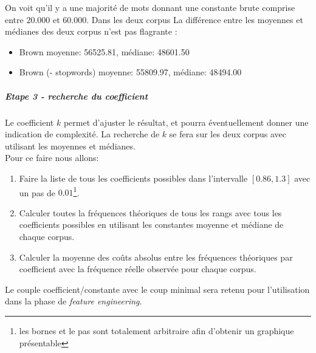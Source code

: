 \documentclass[a4paper,12pt]{article}
\begin{document}
			On voit qu'il y a une majorité de mots donnant une constante brute comprise entre $20.000$ et $60.000$. Dans les deux corpus
			La différence entre les moyennes et médianes des deux corpus n'est pas flagrante :
			\begin{itemize}
				\item Brown moyenne: 56525.81, médiane: 48601.50
				\item Brown (- stopwords) moyenne: 55809.97, médiane: 48494.00
			\end{itemize}


		\subparagraph{Etape 3 - recherche du coefficient}
			Le coefficient $k$ permet d'ajuster le résultat, et pourra éventuellement donner une indication de complexité. La recherche de $k$ se fera sur les deux corpus avec utilisant les moyennes et médianes.\\
			
			Pour ce faire nous allons:

			\begin{enumerate}
				\item Faire la liste de tous les coefficients possibles dans l'intervalle $[0.86, 1.3]$ avec un pas de $0.01$\footnote{les bornes et le pas sont totalement arbitraire afin d'obtenir un graphique présentable}.
				\item Calculer toutes la fréquences théoriques de tous les rangs avec tous les coefficients possibles en utilisant les constantes moyenne et médiane de chaque corpus.
				\item Calculer la moyenne des coûts absolus entre les fréquences théoriques par coefficient avec la fréquence réelle observée pour chaque corpus.\\
			\end{enumerate}
			
			Le couple coefficient/constante avec le coup minimal sera retenu pour l'utilisation dans la phase de \emph{feature engineering}. \\	
			
\end{document}
